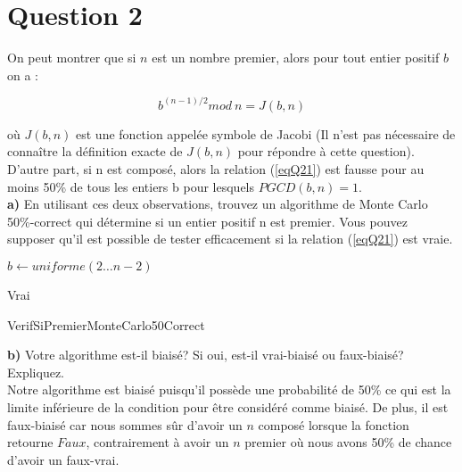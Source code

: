\documentclass[devoir4.tex]{subfiles}
\begin{document}
\section*{Question 2}
On peut montrer que si \(n\) est un nombre premier, alors pour tout entier positif \(b\) on a :

\begin{equation}
	b^{(n-1)/2} mod \: n = J(b,n)
	\label{eqQ21}
\end{equation}

où \(J(b, n)\) est une fonction appelée symbole de Jacobi (Il n'est pas nécessaire de connaître la définition exacte de \(J(b, n)\) pour répondre à cette question). \\

D'autre part, si n est composé, alors la relation (\ref{eqQ21}) est fausse pour au moins 50\% de tous les entiers b pour lesquels \(PGCD(b, n) = 1\). \\

\textbf{a)} En utilisant ces deux observations, trouvez un algorithme de Monte Carlo 50\%-correct qui détermine si un entier positif n est premier. Vous pouvez supposer qu’il est possible de tester efficacement si la relation (\ref{eqQ21}) est vraie. \\ 

\begin{algorithm}[H]
   
    \vspace{0.2cm}
    {
		\(b \gets uniforme(2 \dots n-2) \)
	
	}
	
	\Return Vrai
	
      \caption{VerifSiPremierMonteCarlo50Correct} 
\end{algorithm}

\vspace{0.4cm}

\textbf{b)} Votre algorithme est-il biaisé? Si oui, est-il vrai-biaisé ou faux-biaisé? Expliquez. \\

Notre algorithme est biaisé puisqu'il possède une probabilité de 50\% ce qui est la limite inférieure de la condition pour être considéré comme biaisé. De plus, il est faux-biaisé car nous sommes sûr d'avoir un \(n\) composé lorsque la fonction retourne \(Faux\), contrairement à avoir un \(n\) premier où nous avons 50\% de chance d'avoir un faux-vrai.
\end{document}
